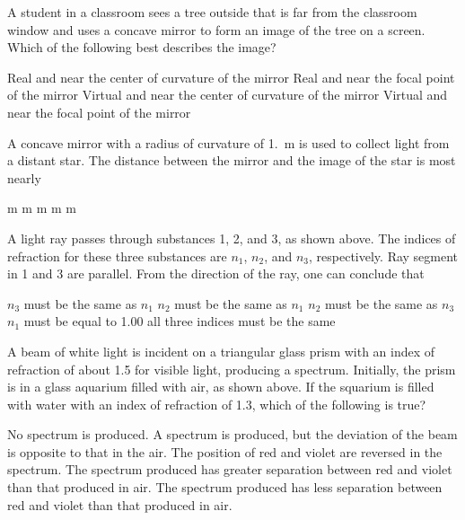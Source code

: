 \documentclass[12pt]{exam}
\newcommand{\pic}[2]{
  \begin{center}
    \texttt{[image: \#2]}
  \end{center}
}
\begin{document}
\begin{questions}
  \question A student in a classroom sees a tree outside that is far from the
  classroom window and uses a concave mirror to form an image of the tree on a
  screen. Which of the following best describes the image?
  \begin{choices}
    \choice Real and near the center of curvature of the mirror
    \choice Real and near the focal point of the mirror
    \choice Virtual and near the center of curvature of the mirror
    \choice Virtual and near the focal point of the mirror
  \end{choices}

  \question A concave mirror with a radius of curvature of \SI{1.}{\metre} is
  used to collect light from a distant star. The distance between the mirror and
  the image of the star is most nearly
  \begin{choices}
     m
     m
     m
     m
     m
  \end{choices}

  \question A light ray passes through substances 1, 2, and 3, as shown above.
  The indices of refraction for these three substances are  $n_1$, $n_2$, and
  $n_3$, respectively. Ray segment in 1 and 3 are parallel. From the direction
  of the ray, one can conclude that
  \begin{choices}
    \choice $n_3$ must be the same as $n_1$
    \choice $n_2$ must be the same as $n_1$
    \choice $n_2$ must be the same as $n_3$
    \choice $n_1$ must be equal to 1.00
    \choice all three indices must be the same
  \end{choices}
  
  \uplevel{
    \vspace{-.3in}
    \pic{.5}{prism-aquarium}
  }
  \question\vspace{-.2in}A beam of white light is incident on a triangular
  glass prism with
  an index of refraction of about 1.5 for visible light, producing a spectrum.
  Initially, the prism is in a glass aquarium filled with air, as shown above.
  If the squarium is filled with water with an index of refraction of 1.3, which
  of the following is true?
  \begin{choices}
    \choice No spectrum is produced.
    \choice A spectrum is produced, but the deviation of the beam is opposite
    to that in the air.
    \choice The position of red and violet are reversed in the spectrum.
    \choice The spectrum produced has greater separation between red and violet
    than that produced in air.
    \choice The spectrum produced has less separation between red and violet
    than that produced in air.
  \end{choices}
  \newpage


\end{questions}
\end{document}
